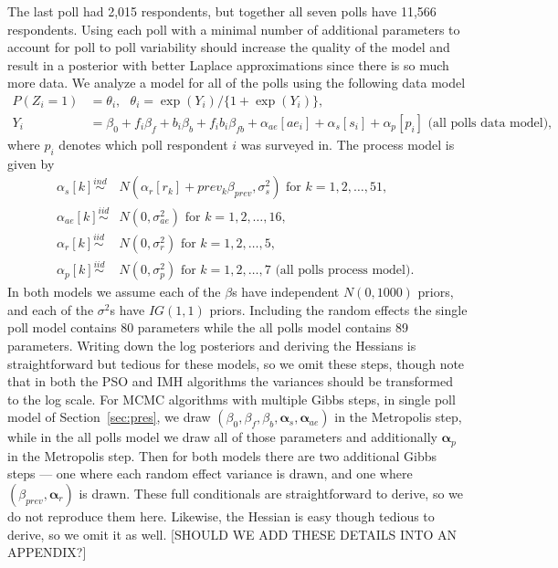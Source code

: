 \documentclass[12pt]{article}
\begin{document}
The last poll had 2,015 respondents, but together all seven polls have 11,566 respondents. Using each poll with a minimal number of additional parameters to account for poll to poll variability should increase the quality of the model and result in a posterior with better Laplace approximations since there is so much more data. We analyze a model for all of the polls using the following data model
\begin{align*}
P(Z_i = 1) &= \theta_i,\ \ \   \theta_i = \exp(Y_i)/\{1 + \exp(Y_i)\}, \\
Y_i &= \beta_0 + f_i\beta_f + b_i\beta_b + f_ib_i\beta_{fb} + \alpha_{ae}[ae_i] + \alpha_{s}[s_i] + \alpha_p[p_i]\mbox{\ \ \ \ (all polls data model), }
\end{align*}
where $p_i$ denotes which poll respondent $i$ was surveyed in. The process model is given by
\begin{align*}
\alpha_s[k] \stackrel{ind}{\sim}& N(\alpha_r[r_k] + prev_k\beta_{prev}, \sigma^2_s) \mbox{ for } k=1,2,\dots,51,\\
\alpha_{ae}[k] \stackrel{iid}{\sim}& N(0, \sigma^2_{ae}) \mbox{ for } k=1,2,\dots,16,\\
\alpha_{r}[k] \stackrel{iid}{\sim}& N(0, \sigma^2_{r}) \mbox{ for } k=1,2,\dots,5,\\ 
\alpha_{p}[k] \stackrel{iid}{\sim}& N(0, \sigma^2_{p}) \mbox{ for } k=1,2,\dots,7 \mbox{\ \ \ \ (all polls process model). }
\end{align*}
In both models we assume each of the $\beta$s have independent $N(0,1000)$ priors, and each of the 
$\sigma^2$s have $IG(1,1)$ priors. Including the random effects the single poll model contains 80 parameters while the all polls model contains 89 parameters. Writing down the log posteriors and deriving the Hessians is straightforward but tedious for these models, so we omit these steps, though note that in both the PSO and IMH algorithms the variances should be transformed to the log scale. For MCMC algorithms with multiple Gibbs steps, in single poll model of Section~\ref{sec:pres}, we draw $(\beta_0, \beta_f, \beta_b, \bm{\alpha}_{s}, \bm{\alpha}_{ae})$ in the Metropolis step, while in the all polls model we draw all of those parameters and additionally $\bm{\alpha}_p$ in the Metropolis step. Then for both models there are two additional Gibbs steps --- one where each random effect variance is drawn, and one where $(\beta_{prev}, \bm{\alpha}_r)$ is drawn. These full conditionals are straightforward to derive, so we do not reproduce them here. Likewise, the Hessian is easy though tedious to derive, so we omit it as well. [SHOULD WE ADD THESE DETAILS INTO AN APPENDIX?]
\end{document}
